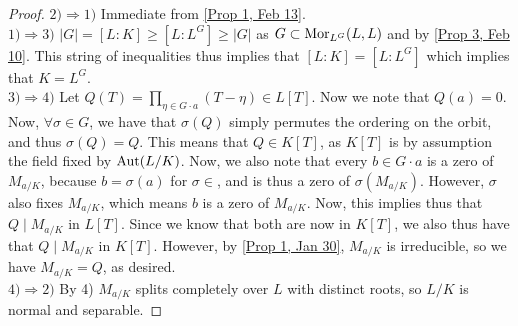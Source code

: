 \begin{proof}
    $2) \Rightarrow 1)$ Immediate from \ref{Prop 1, Feb 13}. \\
    $1) \Rightarrow 3)$ $|G| = [L:K] \geq [L : L^G] \geq |G|$ as $G \subset \operatorname{Mor}_{L^G}(L, L)$
    and by \ref{Prop 3, Feb 10}. This string of inequalities thus implies that
    $[L:K] = [L: L^G]$ which implies that $K = L^G$. \\
    $3) \Rightarrow 4)$ Let $Q(T) = \prod\limits_{\eta \in G \cdot a}{(T - \eta)} \in L[T]$. Now
    we note that $Q(a) = 0$. Now, $\forall \sigma \in G$, we have that $\sigma(Q)$ simply permutes
    the ordering on the orbit, and thus $\sigma(Q) = Q$. This means that $Q \in K[T]$, as $K[T]$ is by
    assumption the field fixed by $\operatorname{Aut}(L/K)$. Now, we also note that every $b \in G \cdot a$ is a zero of
    $M_{a/K}$, because $b = \sigma(a)$ for $\sigma \in $, and is thus a zero of $\sigma(M_{a/K})$.
    However, $\sigma$ also fixes $M_{a/K}$, which means $b$ is a zero of $M_{a/K}$. Now,
    this implies thus that $Q \mid M_{a/K}$ in $L[T]$. Since we know that both are
    now in $K[T]$, we also thus have that $Q \mid M_{a/K}$ in $K[T]$. However, by \ref{Prop 1, Jan 30},
    $M_{a/K}$ is irreducible, so we have $M_{a/K} = Q$, as desired. \\
    $4) \Rightarrow 2)$ By 4) $M_{a/K}$ splits completely over $L$ with distinct
    roots, so $L / K$ is normal and separable.
\end{proof}
